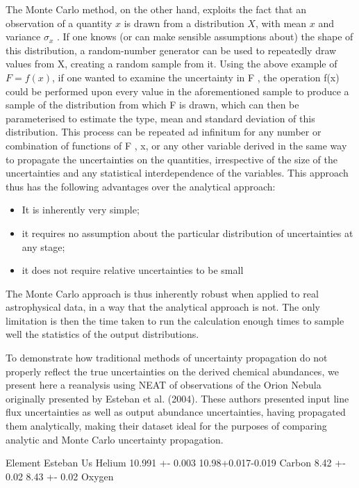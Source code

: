 \documentclass[useAMS,usenatbib]{mn2e}
\begin{document}
The Monte Carlo method, on the other hand, exploits the fact that an observation of a quantity $x$ is drawn from a distribution $X$, with mean $x$ and variance $\sigma_x$ . If one knows (or can make sensible assumptions about) the shape of this distribution, a random-number generator can be used to repeatedly draw values from X, creating a random sample from it. Using the above example of $F = f (x)$, if one wanted to examine the uncertainty in F , the operation f(x) could be performed upon every value in the aforementioned sample to produce a sample of the distribution from which F is drawn, which can then be parameterised to estimate the type, mean and standard deviation of this distribution. This process can be repeated ad infinitum for any number or combination of functions of F , x, or any other variable derived in the same way to propagate the uncertainties on the quantities, irrespective of the size of the uncertainties and any statistical interdependence of the variables.  This approach thus has the following advantages over the analytical approach:

\begin{itemize}
  \item It is inherently very simple;
  \item it requires no assumption about the particular distribution of uncertainties at any stage;
  \item it does not require relative uncertainties to be small
\end{itemize}

The Monte Carlo approach is thus inherently robust when applied to real astrophysical data, in a way that the analytical approach is not.  The only limitation is then the time taken to run the calculation enough times to sample well the statistics of the output distributions.

To demonstrate how traditional methods of uncertainty propagation do not properly reflect the true uncertainties on the derived chemical abundances, we present here a reanalysis using NEAT of observations of the Orion Nebula originally presented by Esteban et al. (2004).  These authors presented input line flux uncertainties as well as output abundance uncertainties, having propagated them analytically, making their dataset ideal for the purposes of comparing analytic and Monte Carlo uncertainty propagation.

Element		Esteban			Us
Helium		10.991 +- 0.003		10.98+0.017-0.019
Carbon		8.42 +- 0.02		8.43 +- 0.02
Oxygen
\end{document}
